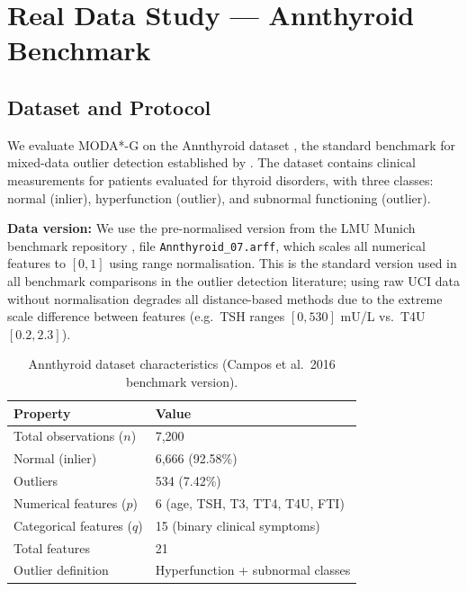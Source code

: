 \documentclass[11pt]{article}
\theoremstyle{plain}
\theoremstyle{definition}
\begin{document}
\section{Real Data Study --- Annthyroid Benchmark}
\label{sec:realdata}

\subsection{Dataset and Protocol}

We evaluate MODA*-G on the Annthyroid dataset
\citep{campos2016}, the standard benchmark for
mixed-data outlier detection established by
\citet{campos2016}. The dataset contains clinical
measurements for patients evaluated for thyroid
disorders, with three classes: normal (inlier),
hyperfunction (outlier), and subnormal functioning
(outlier).

\textbf{Data version:} We use the pre-normalised
version from the LMU Munich benchmark repository
\citep{campos2016}, file \texttt{Annthyroid\_07.arff},
which scales all numerical features to $[0,1]$ using
range normalisation. This is the standard version
used in all benchmark comparisons in the outlier
detection literature; using raw UCI data without
normalisation degrades all distance-based methods
due to the extreme scale difference between features
(e.g.\ TSH ranges $[0,530]$ mU/L vs.\ T4U $[0.2,2.3]$).

\begin{table}[ht]
\centering
\caption{Annthyroid dataset characteristics
  (Campos et al.\ 2016 benchmark version).}
\label{tab:dataset}
\small
\begin{tabular}{ll}
\toprule
Property & Value \\
\midrule
Total observations ($n$) & 7,200 \\
Normal (inlier) & 6,666 (92.58\%) \\
Outliers & 534 (7.42\%) \\
Numerical features ($p$) & 6 (age, TSH, T3, TT4, T4U, FTI) \\
Categorical features ($q$) & 15 (binary clinical symptoms) \\
Total features & 21 \\
Outlier definition & Hyperfunction + subnormal classes \\
\bottomrule
\end{tabular}
\end{table}
\end{document}

